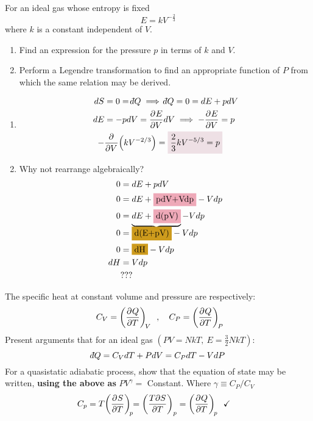 \documentclass{article}
\def\dbar{{\mathchar'26\mkern-12mu d}} %
\begin{document}
\begin{problem}
    For an ideal gas whose entropy is fixed $$E=kV^{-\frac{2}{3}}$$ where $k$ is a constant independent of $V$.
    \begin{enumerate}[label=(\alph*)]
        \item Find an expression for the pressure $p$ in terms of $k$ and $V$.
        \item Perform a Legendre transformation to find an appropriate function
        of $P$ from which the same relation may be derived.
    \end{enumerate}
    \answerline
    \begin{enumerate}[label=\alph*)]
        \item 
        \begin{align*}
            dS&=0=\dbar Q\implies \dbar Q=0=dE+pdV
            \\
            dE&=-pdV=\pder{E}{V}dV\implies -\pder{E}{V}=p
            \\
            -&\pder{V}\qty(kV^{-2/3})=\coloredanswer{\frac{2}{3}kV^{-5/3}=p}
        \end{align*}
        \item Why not rearrange algebraically? 
        \begin{align*}
            0&=dE+pdV
            \\
            0&=dE+\colorbox{Pink2}{pdV+Vdp}-Vdp
            \\
            0&=\underbrace{dE+\colorbox{Pink2}{d(pV)}}-Vdp
            \\[-0.25cm]
            0&=\colorbox{Goldenrod3}{d(E+pV)}-Vdp
            \\
            0&=\colorbox{Goldenrod3}{dH}-Vdp
            \\
            dH&=Vdp
            \\
            &???
        \end{align*}
    \end{enumerate}
\end{problem}\newpage
\begin{problem}
    The specific heat at constant volume and pressure are respectively: 
    $$C_V=\pder{Q}{T}[V]\quad,\quad C_P=\pder{Q}{T}[P]$$ Present arguments that for an ideal gas $(PV=NkT,~E=\frac{3}{2}NkT)$:
    $$\dbar Q=C_VdT+PdV=C_PdT-VdP$$
    For a quasistatic adiabatic process, show that the equation of state may be written, \textbf{using the above as} $PV^\gamma=$ Constant. Where $\gamma\equiv C_P/C_V$
    \answerline
    \begin{align*}
        C_p&=T\pder{S}{T}[p]=\qty(\frac{T\partial S}{\partial T})_{p}=\pder{Q}{T}[p]\quad\checkmark
    \end{align*}
\end{problem}\newpage
\end{document}
